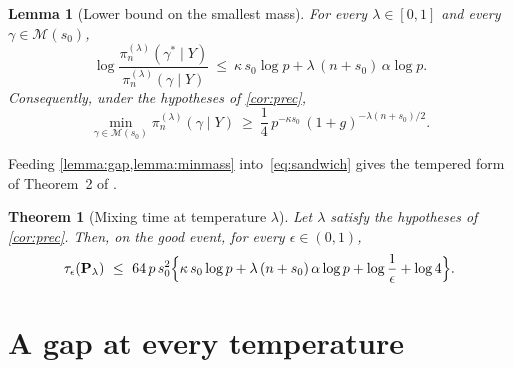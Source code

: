 \documentclass[aos]{imsart}
\theoremstyle{plain}
\newtheorem{theorem}{Theorem}[section]
\newtheorem{lemma}{Lemma}[section]
\theoremstyle{definition}
\begin{document}
    \begin{lemma}[Lower bound on the smallest mass]
        \label{lemma:minmass}
        For every $\lambda\in[0,1]$ and every $\gamma\in\mathscr{M}(s_0)$,
        \begin{equation}
            \label{eq:minmass}
            \log\frac{\pi_n^{(\lambda)}(\gamma^{\ast}\mid Y)}
            {\pi_n^{(\lambda)}(\gamma\mid Y)}
            \ \leq\ \kappa\,s_0\log p
            +\lambda\,(n+s_0)\,\alpha\log p .
        \end{equation}
        Consequently, under the hypotheses of \cref{cor:prec},
        \begin{equation}
            \label{eq:minmass2}
            \min_{\gamma\in\mathscr{M}(s_0)}
            \pi_n^{(\lambda)}(\gamma\mid Y)
            \ \geq\ \frac14\,p^{-\kappa s_0}\,
            (1+g)^{-\lambda(n+s_0)/2} .
        \end{equation}
    \end{lemma}


    Feeding \cref{lemma:gap,lemma:minmass} into~\eqref{eq:sandwich} gives
    the tempered form of Theorem~2 of \citet{YangWainwrightJordan2016}.

    \begin{theorem}[Mixing time at temperature $\lambda$]
        \label{th:mixing}
        Let $\lambda$ satisfy the hypotheses of \cref{cor:prec}. Then, on
        the good event, for every
        $\epsilon\in(0,1)$,
        \begin{equation}
            \label{eq:tau}
            \tau_\epsilon(\mathbf{P}_\lambda)\ \leq\
            64\,p\,s_0^{2}\Bigl\{\kappa\,s_0\log p
            +\lambda\,(n+s_0)\,\alpha\log p
            +\log\frac1\epsilon+\log4\Bigr\} .
        \end{equation}
    \end{theorem}




    \section{A gap at every temperature}
    \label{sec:alltemp}
\end{document}
